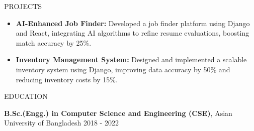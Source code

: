 \documentclass{resume} %
\begin{document}

\begin{rSection}{PROJECTS}

\begin{itemize}
    \item \textbf{AI-Enhanced Job Finder:} Developed a job finder platform using Django and React, integrating AI algorithms to refine resume evaluations, boosting match accuracy by 25\%.
    \item \textbf{Inventory Management System:} Designed and implemented a scalable inventory system using Django, improving data accuracy by 50\% and reducing inventory costs by 15\%.
\end{itemize}

\end{rSection} 


\begin{rSection}{EDUCATION}

{\bf B.Sc.(Engg.) in Computer Science and Engineering (CSE)}, Asian University of Bangladesh \hfill {2018 - 2022}

\end{rSection}
\end{document}
